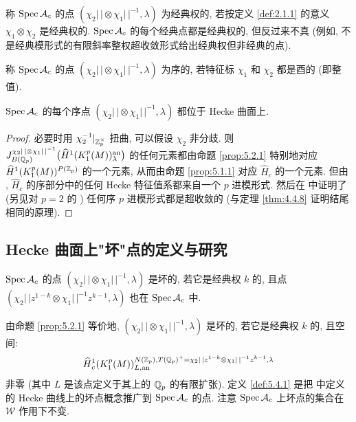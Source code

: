称 $\operatorname{Spec} \mathcal{A}_c$ 的点 $(\chi_2|\,| \otimes \chi_1|\,|^{-1},\lambda)$ 为经典权的, 若按定义 \ref{def:2.1.1} 的意义 $\chi_1 \otimes \chi_2$ 是经典权的.
$\operatorname{Spec} \mathcal{A}_c$ 的每个经典点都是经典权的, 但反过来不真 (例如, 不是经典模形式的有限斜率整权超收敛形式给出经典权但非经典的点).

\begin{definition}\label{def:5.3.1}
称 $\operatorname{Spec} \mathcal{A}_c$ 的点 $(\chi_2|\,| \otimes \chi_1|\,|^{-1},\lambda)$ 为序的, 若特征标 $\chi_1$ 和 $\chi_2$ 都是酉的 (即整值).
\end{definition}

\begin{proposition}\label{prop:5.3.2}
$\operatorname{Spec} \mathcal{A}_c$ 的每个序点 $(\chi_2|\,| \otimes \chi_1|\,|^{-1},\lambda)$ 都位于 Hecke 曲面上.
\end{proposition}

\begin{proof}
必要时用 $\chi_2^{-1}|_{\mathbb{Z}_p^{\times}}$ 扭曲, 可以假设 $\chi_2$ 非分歧.
则 $J_{B(\mathbb{Q}_p)}^{\chi_2|\,| \otimes \chi_1|\,|^{-1}}\bigl(\widehat{H}{}^{1}(K_1^{p}(M))^{\mathrm{an}}_{\lambda}\bigr)$ 的任何元素都由命题 \ref{prop:5.2.1} 特别地对应 $\widehat{H}{}^{1}(K_1^{p}(M))^{P(\mathbb{Z}_p)}$ 的一个元素, 从而由命题 \ref{prop:5.1.1} 对应 $\widehat{H}_c$ 的一个元素.
但由 \cite{ref:34}, $\widehat{H}_c$ 的序部分中的任何 Hecke 特征值系都来自一个 $p$ 进模形式.
然后在 \cite{ref:32} 中证明了 (另见对 $p = 2$ 的 \cite{ref:11}) 任何序 $p$ 进模形式都是超收敛的 (与定理 \ref{thm:4.4.8} 证明结尾相同的原理).
\end{proof}

\subsection{Hecke 曲面上"坏"点的定义与研究}\label{sec:5.4}

\begin{definition}\label{def:5.4.1}
$\operatorname{Spec} \mathcal{A}_c$ 的点 $(\chi_2|\,| \otimes \chi_1|\,|^{-1},\lambda)$ 是坏的, 若它是经典权 $k$ 的, 且点 $(\chi_2|\,|z^{1-k} \otimes \chi_1|\,|^{-1}z^{k-1},\lambda)$ 也在 $\operatorname{Spec} \mathcal{A}_c$ 中.
\end{definition}

由命题 \ref{prop:5.2.1} 等价地, $(\chi_2|\,| \otimes \chi_1|\,|^{-1},\lambda)$ 是坏的, 若它是经典权 $k$ 的, 且空间:
\[
\widehat{H}{}_{c}^{1}(K_1^{p}(M))_{L,\mathrm{an}}^{N(\mathbb{Z}_p),T(\mathbb{Q}_p)^{+} = \chi_2|\,|z^{1-k} \otimes \chi_1|\,|^{-1}z^{k-1},\lambda}
\]
非零 (其中 $L$ 是该点定义于其上的 $\mathbb{Q}_p$ 的有限扩张).
定义 \ref{def:5.4.1} 是把 \cite[Def.~4.5.5]{ref:24} 中定义的 Hecke 曲线上的坏点概念推广到 $\operatorname{Spec} \mathcal{A}_c$ 的点.
注意 $\operatorname{Spec} \mathcal{A}_c$ 上坏点的集合在 $\mathcal{W}$ 作用下不变.

